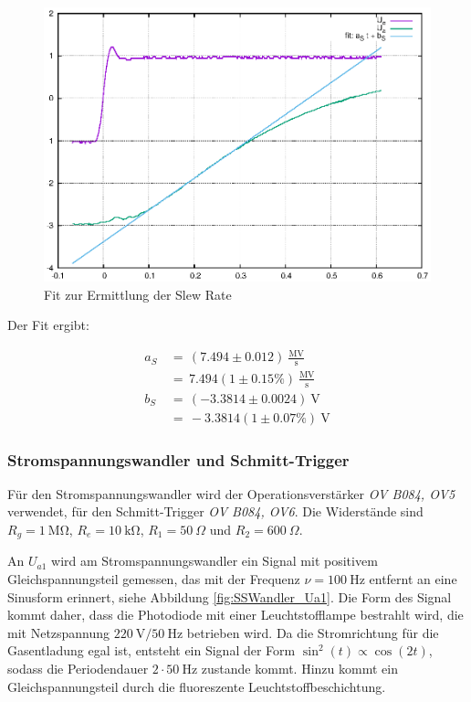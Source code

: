 \documentclass[10pt,a4paper]{scrartcl}
\begin{document}
\begin{figure}[!ht]
    \includegraphics[width=\textwidth]{graphics/fit_slew_rate.eps}
    \caption{Fit zur Ermittlung der Slew Rate}
    \label{fig:fit_slew}
\end{figure}

Der Fit ergibt:

\begin{align*}
    a_S\,&=\,\left(7.494 \pm 0.012\right)~\mathrm{\frac{MV}{s}}\\
    &=\,7.494 \left(1\pm 0.15\%\right)~\mathrm{\frac{MV}{s}}\\
    b_S\,&=\,\left(-3.3814 \pm 0.0024\right)~\mathrm{V}\\
    &=\,-3.3814 \left(1\pm 0.07\%\right)~\mathrm{V}
\end{align*}

\pagebreak
\subsubsection {Stromspannungswandler und Schmitt-Trigger}

Für den Stromspannungswandler wird der Operationsverstärker \emph{OV B084, OV5}
verwendet,
für den Schmitt-Trigger \emph{OV B084, OV6}.
Die Widerstände sind $R_g=1~\mathrm{M\Omega}$, $R_e=10~\mathrm{k\Omega}$,
$R_1=50~\Omega$ und $R_2=600~\Omega$.

An $U_{a1}$ wird am Stromspannungswandler ein Signal mit positivem
Gleichspannungsteil gemessen,
das mit der Frequenz $\nu=100~\mathrm{Hz}$ entfernt an eine Sinusform erinnert,
siehe Abbildung \ref{fig:SSWandler_Ua1}.
Die Form des Signal kommt daher,
dass die Photodiode mit einer Leuchtstofflampe bestrahlt wird,
die mit Netzspannung $220~\mathrm V/50~\mathrm{Hz}$ betrieben wird.
Da die Stromrichtung für die Gasentladung egal ist,
entsteht ein Signal der Form $\sin^2(t)\propto\cos(2t)$,
sodass die Periodendauer $2\cdot50~\mathrm{Hz}$ zustande kommt.
Hinzu kommt ein Gleichspannungsteil durch die fluoreszente
Leuchtstoffbeschichtung.
\end{document}
